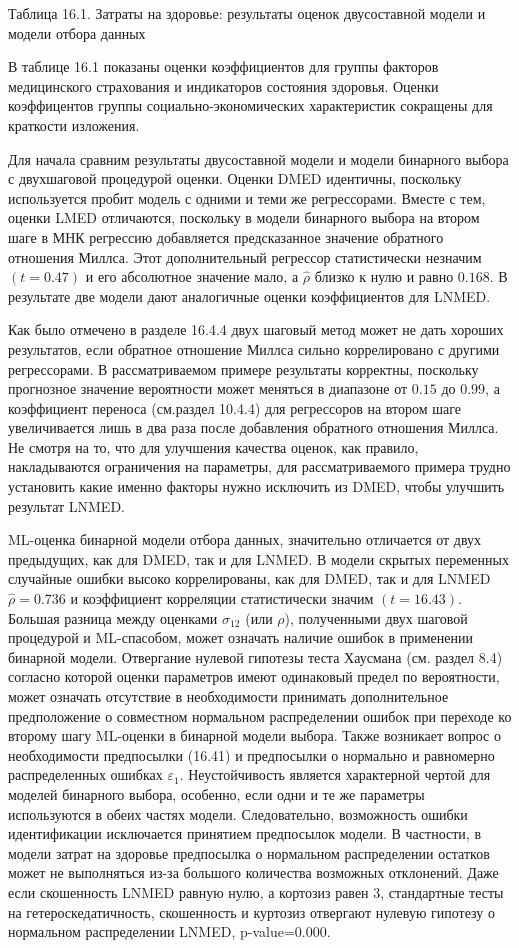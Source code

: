 Таблица 16.1. Затраты на здоровье: результаты оценок двусоставной модели и модели отбора данных


В таблице 16.1  показаны оценки коэффициентов для группы факторов медицинского страхования и индикаторов состояния здоровья. Оценки коэффицентов группы социально-экономических характеристик сокращены для краткости изложения.

Для начала сравним результаты двусоставной модели и модели бинарного выбора с двухшаговой процедурой оценки. Оценки DMED идентичны, поскольку используется пробит модель с одними и теми же регрессорами. Вместе с тем, оценки LMED отличаются, поскольку в модели бинарного выбора на втором шаге в МНК регрессию добавляется предсказанное значение обратного отношения Миллса. Этот дополнительный регрессор статистически незначим $(t=0.47)$ и его абсолютное значение мало, а $\hat{\rho}$ близко к нулю и равно $0.168$. В результате две модели дают аналогичные оценки коэффициентов для LNMED.


Как было отмечено в разделе 16.4.4 двух шаговый метод может не дать хороших результатов, если обратное отношение Миллса сильно коррелировано с другими регрессорами. В рассматриваемом примере результаты корректны, поскольку прогнозное значение вероятности может меняться в диапазоне от $0.15$ до $0.99$, а коэффициент переноса (см.раздел 10.4.4) для регрессоров на втором шаге	увеличивается лишь в два раза после добавления обратного отношения Миллса. Не смотря на то, что для улучшения качества оценок, как правило, накладываются ограничения на параметры, для рассматриваемого примера трудно установить какие именно факторы нужно исключить из DMED, чтобы улучшить результат LNMED.

ML-оценка бинарной модели отбора данных, значительно отличается от двух предыдущих, как для DMED, так и для LNMED. В модели скрытых переменных случайные ошибки высоко коррелированы, как для DMED, так и для LNMED $\hat{\rho}=0.736$ и коэффициент корреляции статистически значим $(t=16.43)$. Большая разница между оценками $\sigma_{12}$ (или $\rho$), полученными двух шаговой процедурой и ML-спасобом,  может означать наличие ошибок в применении бинарной модели. Отвергание нулевой гипотезы теста Хаусмана (см. раздел 8.4) согласно которой оценки параметров имеют одинаковый предел по вероятности, может означать отсутствие в необходимости принимать дополнительное предположение о совместном нормальном распределении ошибок при переходе ко второму шагу ML-оценки в бинарной модели выбора. Также возникает вопрос о необходимости предпосылки (16.41) и предпосылки о нормально и равномерно распределенных ошибках $\varepsilon_1$. Неустойчивость является характерной чертой для моделей бинарного выбора, особенно, если одни и те же параметры используются в обеих частях модели. Следовательно, возможность ошибки идентификации исключается принятием предпосылок модели. В частности, в модели затрат на здоровье предпосылка о нормальном распределении остатков может не выполняться из-за большого количества возможных отклонений. Даже если  скошенность LNMED равную нулю, а кортозиз равен $3$, стандартные тесты на гетероскедатичность, скошенность и куртозиз отвергают нулевую гипотезу о нормальном распределении LNMED, p-value=0.000.


